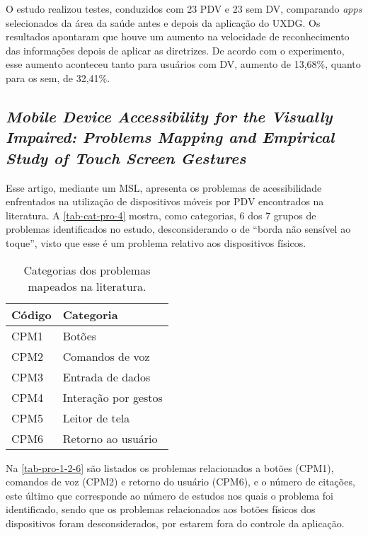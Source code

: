 O estudo realizou testes, conduzidos com 23 PDV e 23 sem DV, comparando \emph{apps} selecionados da área da saúde antes e depois da aplicação do UXDG\@.
Os resultados apontaram que houve um aumento na velocidade de reconhecimento das informações depois de aplicar as diretrizes.
De acordo com o experimento, esse aumento aconteceu tanto para usuários com DV, aumento de 13,68\%, quanto para os sem, de 32,41\%.

\subsection{\emph{Mobile Device Accessibility for the Visually Impaired: Problems Mapping and Empirical Study of Touch Screen Gestures}}

Esse artigo, mediante um MSL, apresenta os problemas de acessibilidade enfrentados na utilização de dispositivos móveis por PDV encontrados na literatura.
A \autoref{tab-cat-pro-4} mostra, como categorias, 6 dos 7 grupos de problemas identificados no estudo,
desconsiderando o de ``borda não sensível ao toque'', visto que esse é um problema relativo aos dispositivos físicos.

\begin{table}[htb]
  \begin{center}
    \ABNTEXfontereduzida
    \caption{Categorias dos problemas mapeados na literatura.}
    \label{tab-cat-pro-4}
    \begin{tabular}{p{2.0cm}|p{5.0cm}}
      \textbf{Código} & \textbf{Categoria}   \\
      \hline
      CPM1            & Botões               \\
      \hline
      CPM2            & Comandos de voz      \\
      \hline
      CPM3            & Entrada de dados     \\
      \hline
      CPM4            & Interação por gestos \\
      \hline
      CPM5            & Leitor de tela       \\
      \hline
      CPM6            & Retorno ao usuário   \\
    \end{tabular}
  \end{center}
\end{table}

Na \autoref{tab-pro-1-2-6} são listados os problemas relacionados a botões (CPM1), comandos de voz (CPM2) e retorno do usuário (CPM6),
e o número de citações, este último que corresponde ao número de estudos nos quais o problema foi identificado, sendo que os problemas
relacionados aos botões físicos dos dispositivos foram desconsiderados, por estarem fora do controle da aplicação.


